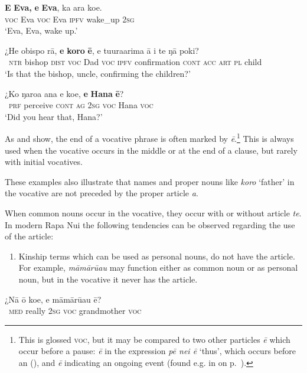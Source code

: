 \ea\label{ex:8.214}
\gll \textbf{E} \textbf{Eva,} \textbf{e} \textbf{Eva}, ka {\ꞌ}ara koe. \\
\textsc{voc} Eva \textsc{voc} Eva \textsc{ipfv} wake\_up \textsc{2sg} \\

\glt 
‘Eva, Eva, wake up.’ \textstyleExampleref{[R210.187]} 
\z

\ea\label{ex:8.215}
\gll ¿He obispo rā, \textbf{e} \textbf{koro} \textbf{ē}, e tu{\ꞌ}ura{\ꞌ}arima {\ꞌ}ā i te ŋā poki?\\
~\textsc{ntr} bishop \textsc{dist} \textsc{voc} Dad \textsc{voc} \textsc{ipfv} confirmation \textsc{cont} \textsc{acc} \textsc{art} \textsc{pl} child\\

\glt 
‘Is that the bishop, uncle, confirming the children?’ \textstyleExampleref{[R413.591]} 
\z

\ea\label{ex:8.216}
\gll ¿Ko ŋaro{\ꞌ}a {\ꞌ}ana e koe, \textbf{e} \textbf{Hana} \textbf{ē}? \\
~\textsc{prf} perceive \textsc{cont} \textsc{ag} \textsc{2sg} \textsc{voc} Hana \textsc{voc} \\

\glt
‘Did you hear that, Hana?’ \textstyleExampleref{[R485.016]} 
\z

As  and  show, the end of a vocative phrase is often marked by \textit{ē}.\footnote{\label{fn:453}This  is glossed \textsc{voc}, but it may be compared to two other particles \textit{ē} which occur before a pause: \textit{ē} in the expression \textit{pē nei ē} ‘thus’, which occurs before an  (), and \textit{ē} indicating an ongoing event (found e.g. in  on p.~\pageref{ex:7.159}).} This  is always used when the vocative occurs in the middle or at the end of a clause, but rarely with initial vocatives.

These examples also illustrate that names and proper nouns like \textit{koro} ‘father’ in the vocative are not preceded by the proper article \textit{a}. 

When common nouns occur in the vocative, they occur with or without article \textit{te}. In modern Rapa Nui the following tendencies can be observed regarding the use of the article:

\begin{enumerate}
\item 
Kinship terms which can be used as personal nouns, do not have the article. For example, \textit{māmārū{\ꞌ}au} may function either as common noun or as personal noun, but in the vocative it never has the article. 
\end{enumerate}
\ea\label{ex:8.217}
\gll ¿Nā {\ꞌ}ō koe, e māmārū{\ꞌ}au ē?\\
~\textsc{med} really \textsc{2sg} \textsc{voc} grandmother \textsc{voc}\\

